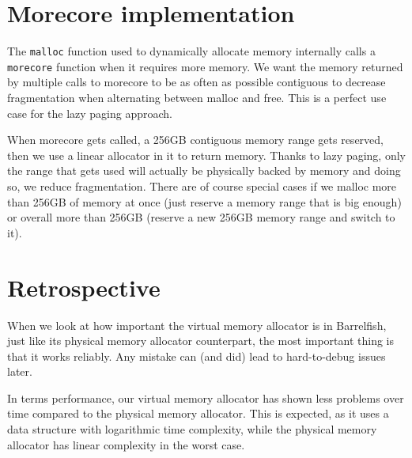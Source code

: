 \section{Morecore implementation}

The \texttt{malloc} function used to dynamically allocate memory internally calls a \verb|morecore| function when it requires more memory. We want the memory returned by multiple calls to morecore to be as often as possible contiguous to decrease fragmentation when alternating between malloc and free. This is a perfect use case for the lazy paging approach.

When morecore gets called, a 256GB contiguous memory range gets reserved, then we use a linear allocator in it to return memory. Thanks to lazy paging, only the range that gets used will actually be physically backed by memory and doing so, we reduce fragmentation. There are of course special cases if we malloc more than 256GB of memory at once (just reserve a memory range that is big enough) or overall more than 256GB (reserve a new 256GB memory range and switch to it).

\section{Retrospective}

When we look at how important the virtual memory allocator is in Barrelfish, just like its physical memory allocator counterpart, the most important thing is that it works reliably. Any mistake can (and did) lead to hard-to-debug issues later. 

In terms performance, our virtual memory allocator has shown less problems over time compared to the physical memory allocator. This is expected, as it uses a data structure with logarithmic time complexity, while the physical memory allocator has linear complexity in the worst case.
